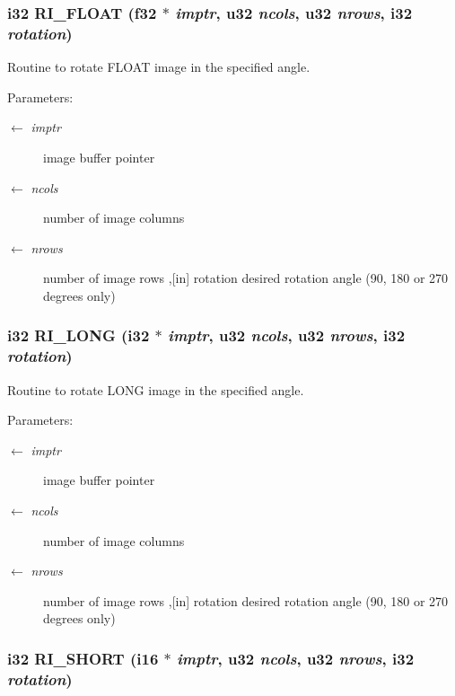 \subsubsection{\setlength{\rightskip}{0pt plus 5cm}i32 RI\_\-FLOAT (f32 $\ast$ {\em imptr}, u32 {\em ncols}, u32 {\em nrows}, i32 {\em rotation})}\label{GU__transformations_8h_c6b9093dd001418072247d73f6c5dda7}


Routine to rotate FLOAT image in the specified angle. \begin{Desc}
\item[Parameters:]
\begin{description}
\item[\mbox{$\leftarrow$} {\em imptr}]image buffer pointer \item[\mbox{$\leftarrow$} {\em ncols}]number of image columns \item[\mbox{$\leftarrow$} {\em nrows}]number of image rows ,[in] rotation desired rotation angle (90, 180 or 270 degrees only) \end{description}
\end{Desc}
\subsubsection{\setlength{\rightskip}{0pt plus 5cm}i32 RI\_\-LONG (i32 $\ast$ {\em imptr}, u32 {\em ncols}, u32 {\em nrows}, i32 {\em rotation})}\label{GU__transformations_8h_523be0534bbdecee55a3c541e039ef72}


Routine to rotate LONG image in the specified angle. \begin{Desc}
\item[Parameters:]
\begin{description}
\item[\mbox{$\leftarrow$} {\em imptr}]image buffer pointer \item[\mbox{$\leftarrow$} {\em ncols}]number of image columns \item[\mbox{$\leftarrow$} {\em nrows}]number of image rows ,[in] rotation desired rotation angle (90, 180 or 270 degrees only) \end{description}
\end{Desc}
\subsubsection{\setlength{\rightskip}{0pt plus 5cm}i32 RI\_\-SHORT (i16 $\ast$ {\em imptr}, u32 {\em ncols}, u32 {\em nrows}, i32 {\em rotation})}\label{GU__transformations_8h_3b854749d807498df8019084d13d65c5}


